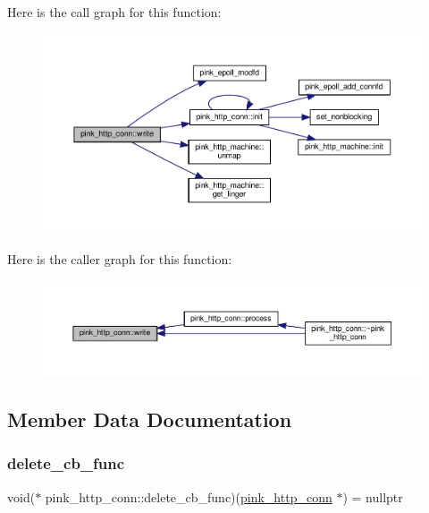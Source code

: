 Here is the call graph for this function\+:
\nopagebreak
\begin{figure}[H]
\begin{center}
\leavevmode
\includegraphics[width=350pt]{classpink__http__conn_a362df085394bbf2818c8af93932c80d5_cgraph}
\end{center}
\end{figure}
Here is the caller graph for this function\+:
\nopagebreak
\begin{figure}[H]
\begin{center}
\leavevmode
\includegraphics[width=350pt]{classpink__http__conn_a362df085394bbf2818c8af93932c80d5_icgraph}
\end{center}
\end{figure}


\subsection{Member Data Documentation}
\mbox{\label{classpink__http__conn_a36a48a19aa593001494eb51106628ebd}} 
\subsubsection{\texorpdfstring{delete\+\_\+cb\+\_\+func}{delete\_cb\_func}}
{\footnotesize\ttfamily void($\ast$ pink\+\_\+http\+\_\+conn\+::delete\+\_\+cb\+\_\+func)(\hyperlink{classpink__http__conn}{pink\+\_\+http\+\_\+conn} $\ast$) = nullptr\hspace{0.3cm}{\ttfamily [static]}}



